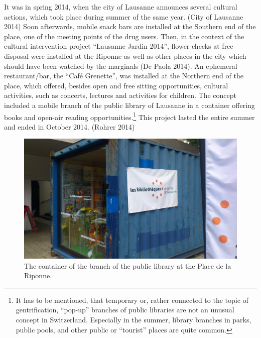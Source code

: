 \documentclass[a4paper,
fontsize=11pt,
oneside,
numbers=noperiodatend,
parskip=half-,
bibliography=totoc,
final
]{scrartcl}
\begin{document}
It was in spring 2014, when the city of Lausanne announces several
cultural actions, which took place during summer of the same year. (City
of Lausanne 2014) Soon afterwards, mobile snack bars are installed at
the Southern end of the place, one of the meeting points of the drug
users. Then, in the context of the cultural intervention project
\enquote{Lausanne Jardin 2014}, flower checks at free disposal were
installed at the Riponne as well as other places in the city which
should have been watched by the marginals (De Paola 2014). An ephemeral
restaurant/bar, the \enquote{Café Grenette}, was installed at the
Northern end of the place, which offered, besides open and free sitting
opportunities, cultural activities, such as concerts, lectures and
activities for children. The concept included a mobile branch of the
public library of Lausanne in a container offering books and open-air
reading opportunities.\footnote{It has to be mentioned, that temporary
  or, rather connected to the topic of gentrification, \enquote{pop-up}
  branches of public libraries are not an unusual concept in
  Switzerland. Especially in the summer, library branches in parks,
  public pools, and other public or \enquote{tourist} places are quite
  common.} This project lasted the entire summer and ended in October
2014. (Rohrer 2014)

\begin{figure}[htbp]
\centering
\includegraphics{img/BlumerSchuldt03.jpg}
\caption{The container of the branch of the public library at the Place
de la Riponne.}
\end{figure}
\end{document}
